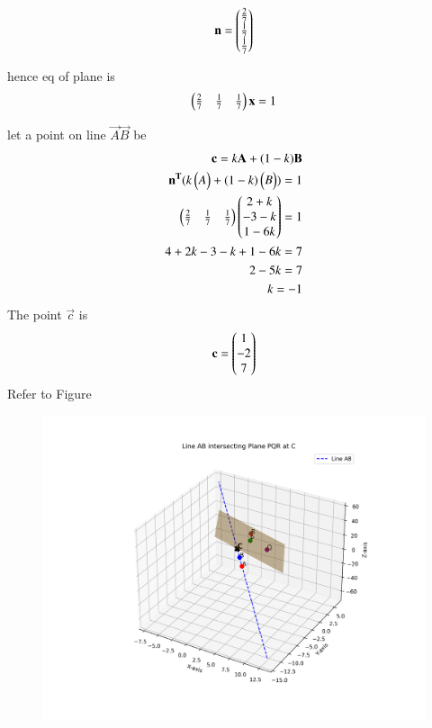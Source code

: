 \documentclass[journal]{IEEEtran}
\begin{document}
\begin{align}
\mathbf{n}=
\begin{pmatrix}\frac{2}{7} 
       \\
       \frac{1}{7} 
       \\
       \frac{1}{7} 
\end{pmatrix}
\end{align}





hence eq of plane is
\begin{align}
 \begin{pmatrix}\tfrac{2}{7} & \tfrac{1}{7} & \tfrac{1}{7}\end{pmatrix} 
 \mathbf{x}
 =1
\end{align}   


let a point on line $\vec{A}\vec{B}$ be 
\begin{align}
\mathbf{c}=k\mathbf{A}+(1-k)\mathbf{B}\\
\mathbf{n^T} 
(k\begin{pmatrix}A\end{pmatrix}+(1-k)\begin{pmatrix}B\end{pmatrix})
 =1\\
 \begin{pmatrix}\frac{2}{7} & \frac{1}{7} & \frac{1}{7}\end{pmatrix}
 \begin{pmatrix}2+k
               \\
              -3-k
              \\
              1-6k
 \end{pmatrix}=1\\
 4+2k-3-k+1-6k=7\\
2-5k=7\\
k=-1
\end{align}
The point $\vec{c}$ is
\begin{align}
    \mathbf{c}=\begin{pmatrix}1
                   \\
                   -2
                   \\
                   7
             \end{pmatrix}
\end{align}
Refer to Figure

\begin{figure}[H]
\begin{center}
\includegraphics[width=0.6\columnwidth]{figs/graph8.png}
\end{center}
\caption{}
\label{fig:Fig}
\end{figure}
\end{document}
